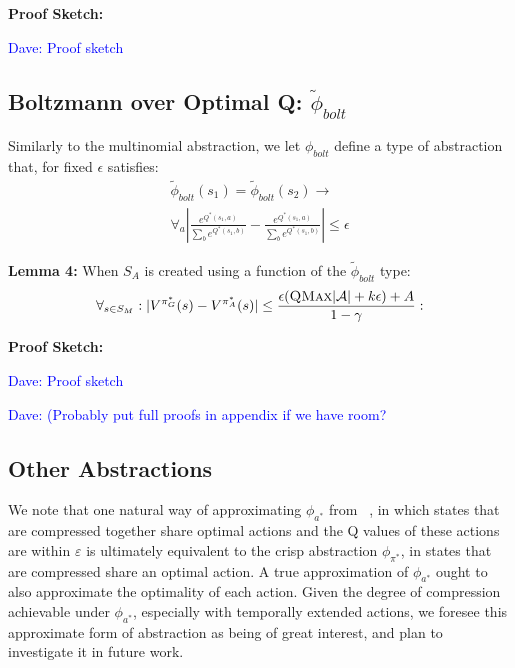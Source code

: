\documentclass{article}
\newcommand{\ep}{\widetilde \phi}
\newcommand\dnote[1]{\textcolor{blue}{Dave: #1}}
\begin{document}
{\bf Proof Sketch:}

\dnote{Proof sketch}


\subsection{Boltzmann over Optimal Q: $\ep_{bolt}$}

Similarly to the multinomial abstraction, we let $\phi_{bolt}$ define a type of abstraction that, for fixed $\epsilon$ satisfies:
\begin{multline}
\ep_{bolt}(s_1) = \ep_{bolt}(s_2) \rightarrow \\
\forall_{a} \left|\frac{e^{Q^*(s_1,a)}}{\sum_b e^{Q^*(s_1,b)}} - \frac{e^{Q^*(s_1,a)}}{\sum_b e^{Q^*(s_1,b)}}\right| \leq \epsilon
\end{multline}

{\bf Lemma 4:} When $S_A$ is created using a function of the $\ep_{bolt}$ type:
\begin{equation}
\forall_{s \in S_M} : | V^{\pi^*_G}(s) - V^{\pi^*_{A}}(s) | \leq \frac{\epsilon(\textsc{QMax}|\mathcal{A}| + k\epsilon) + A}{1-\gamma}:
\end{equation}

{\bf Proof Sketch:}

\dnote{Proof sketch}


\dnote{(Probably put full proofs in appendix if we have room?}











\subsection{Other Abstractions}

We note that one natural way of approximating $\phi_{a^*}$ from ~\cite{li2006towards}, in which states that are compressed together share optimal actions and the Q values of these actions are within $\varepsilon$ is ultimately equivalent to the crisp abstraction $\phi_{\pi^*}$, in states that are compressed share an optimal action. A true approximation of $\phi_{a^*}$ ought to also approximate the optimality of each action. Given the degree of compression achievable under $\phi_{a^*}$, especially with temporally extended actions, we foresee this approximate form of abstraction as being of great interest, and plan to investigate it in future work.
\end{document}
